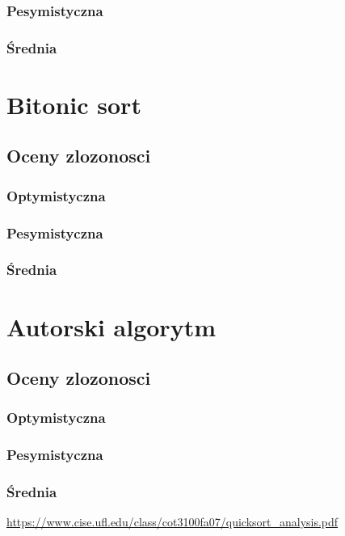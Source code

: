 \subsubsection{Pesymistyczna}
\subsubsection{Średnia}
\section{Bitonic sort}
\subsection{Oceny zlozonosci}
\subsubsection{Optymistyczna}
\subsubsection{Pesymistyczna}
\subsubsection{Średnia}
\section{Autorski algorytm}
\subsection{Oceny zlozonosci}
\subsubsection{Optymistyczna}
\subsubsection{Pesymistyczna}
\subsubsection{Średnia}

\begin{thebibliography}{99}
 \url{https://www.cise.ufl.edu/class/cot3100fa07/quicksort_analysis.pdf}
\end{thebibliography}

